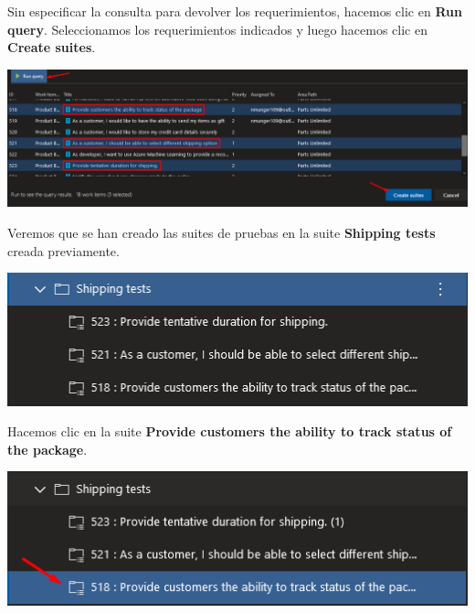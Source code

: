 \documentclass{elsarticle}
\begin{document}
Sin especificar la consulta para devolver los requerimientos, hacemos clic en \textbf{Run query}. Seleccionamos los requerimientos indicados y luego hacemos clic en \textbf{Create suites}.
\begin{center}
	\includegraphics[width=\columnwidth]{img/Screenshot_50.png}
\end{center}

Veremos que se han creado las suites de pruebas en la suite \textbf{Shipping tests} creada previamente.
\begin{center}
	\includegraphics[width=\columnwidth]{img/Screenshot_51.png}
\end{center}

Hacemos clic en la suite \textbf{Provide customers the ability to track status of the package}.
\begin{center}
	\includegraphics[width=\columnwidth]{img/Screenshot_53.png}
\end{center}
\end{document}
